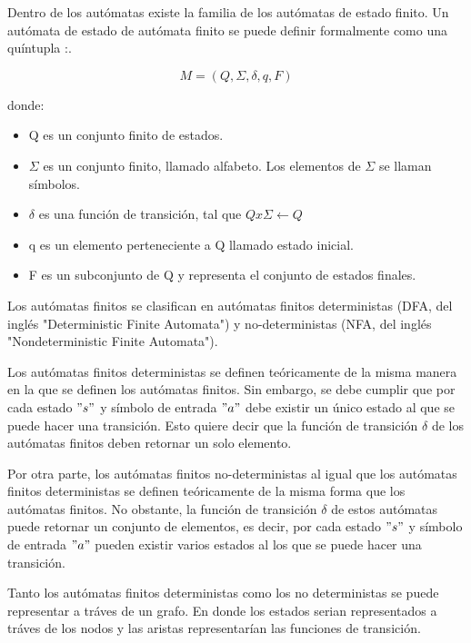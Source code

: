 Dentro de los autómatas existe la familia de los autómatas de estado finito. Un autómata de estado de autómata finito se puede definir formalmente como una quíntupla \cite{automataFinito}:.

\begin{equation}
M = (Q,\Sigma,\delta,q,F)
\end{equation}

donde:

\begin{itemize}

\item Q es un conjunto finito de estados.

\item  $\Sigma$ es un conjunto finito, llamado alfabeto. Los elementos de $\Sigma$ se llaman símbolos.

\item $\delta$ es una función de transición, tal que $ Q x \Sigma \leftarrow Q$
 
\item  q  es un elemento perteneciente a Q llamado estado inicial.

\item F es un subconjunto de Q y representa el conjunto de estados finales.

\end{itemize}

Los autómatas finitos se clasifican en autómatas finitos deterministas (DFA, del inglés "Deterministic Finite Automata") y no-deterministas (NFA, del inglés "Nondeterministic Finite Automata").

Los autómatas finitos deterministas se definen teóricamente de la misma manera en la que se definen los autómatas finitos. Sin embargo, se debe cumplir que por cada estado $"s"$ y símbolo de entrada $"a"$ debe existir un único estado al que se puede hacer una transición. Esto quiere decir que la función de transición $\delta$ de los autómatas finitos deben retornar un solo elemento.

Por otra parte, los autómatas finitos no-deterministas al igual que los autómatas finitos deterministas se definen teóricamente de la misma forma que los autómatas finitos. No obstante, la función de transición $\delta$ de estos autómatas puede retornar un conjunto de elementos, es decir, por cada estado $"s"$ y símbolo de entrada $"a"$ pueden existir varios estados al los que se puede hacer una transición.

Tanto los autómatas finitos deterministas como los no deterministas se puede representar a tráves de un grafo. En donde los estados serian representados a tráves de los nodos y las aristas representarían las funciones de transición. 

